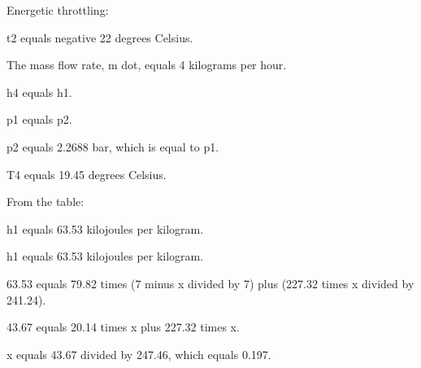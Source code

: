 Energetic throttling:

t2 equals negative 22 degrees Celsius.

The mass flow rate, m dot, equals 4 kilograms per hour.

h4 equals h1.

p1 equals p2.

p2 equals 2.2688 bar, which is equal to p1.

T4 equals 19.45 degrees Celsius.

From the table:

h1 equals 63.53 kilojoules per kilogram.

h1 equals 63.53 kilojoules per kilogram.

63.53 equals 79.82 times (7 minus x divided by 7) plus (227.32 times x divided by 241.24).

43.67 equals 20.14 times x plus 227.32 times x.

x equals 43.67 divided by 247.46, which equals 0.197.
